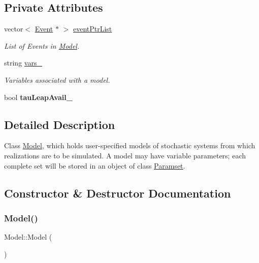 \subsection*{Private Attributes}
\begin{DoxyCompactItemize}
\item 
\mbox{\label{class_model_ab1a536085bce5b910dd354e396583db6}} 
vector$<$ \hyperlink{class_event}{Event} $\ast$ $>$ \hyperlink{class_model_ab1a536085bce5b910dd354e396583db6}{event\+Ptr\+List}
\begin{DoxyCompactList}\small\item\em List of Events in \hyperlink{class_model}{Model}. \end{DoxyCompactList}\item 
\mbox{\label{class_model_a713e115e1b8d997490d80d877ffb4740}} 
string \hyperlink{class_model_a713e115e1b8d997490d80d877ffb4740}{vars\+\_\+}
\begin{DoxyCompactList}\small\item\em Variables associated with a model. \end{DoxyCompactList}\item 
\mbox{\label{class_model_ad1c8e8467a77fc52e4e6a4fb416111f5}} 
bool {\bfseries tau\+Leap\+Avail\+\_\+}
\end{DoxyCompactItemize}


\subsection{Detailed Description}
Class \hyperlink{class_model}{Model}, which holds user-\/specified models of stochastic systems from which realizations are to be simulated. A model may have variable parameters; each complete set will be stored in an object of class \hyperlink{class_paramset}{Paramset}. 

\subsection{Constructor \& Destructor Documentation}
\mbox{\label{class_model_ae3b375de5f6df4faf74a95d64748e048}} 
\subsubsection{\texorpdfstring{Model()}{Model()}}
{\footnotesize\ttfamily Model\+::\+Model (\begin{DoxyParamCaption}{ }\end{DoxyParamCaption})}

